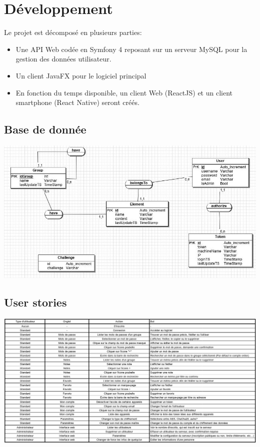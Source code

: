 \documentclass[oneside]{report}
\begin{document}
	\chapter{Développement}
	\par Le projet est décomposé en plusieurs parties:
	\begin{itemize}
		\item \par Une API Web codée en Symfony 4 reposant sur un serveur MySQL pour la gestion des données utilisateur.\\
		\item \par Un client JavaFX pour le logiciel principal\\
		\item \par En fonction du temps disponible, un client Web (ReactJS) et un client smartphone (React Native) seront créés.
	\end{itemize}
	\section{Base de donnée}
	\includegraphics[scale=2]{mcd}

	\section{User stories}
	\includegraphics[scale=.40]{userstories}
\end{document}
